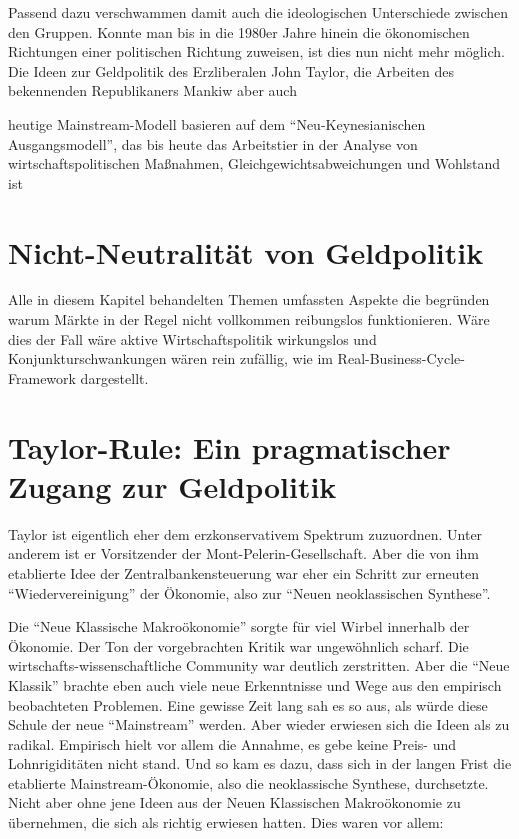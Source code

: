Passend dazu verschwammen damit auch die ideologischen Unterschiede zwischen den Gruppen. Konnte man bis in die 1980er Jahre hinein die ökonomischen Richtungen einer politischen Richtung zuweisen, ist dies nun nicht mehr möglich.
Die Ideen zur Geldpolitik des Erzliberalen John Taylor, die Arbeiten des bekennenden Republikaners Mankiw aber auch 


heutige Mainstream-Modell basieren auf dem "`Neu-Keynesianischen Ausgangsmodell"', das bis heute das Arbeitstier in der Analyse von wirtschaftspolitischen Maßnahmen, Gleichgewichtsabweichungen und Wohlstand ist \parencite[S. 52]{Gali2015}



\section{Nicht-Neutralität von Geldpolitik}
Alle  in diesem Kapitel behandelten Themen umfassten Aspekte die begründen warum Märkte in der Regel nicht vollkommen reibungslos funktionieren. Wäre dies der Fall wäre aktive Wirtschaftspolitik wirkungslos und Konjunkturschwankungen wären rein zufällig, wie im Real-Business-Cycle-Framework dargestellt.

\textcite[S. 823]{Akerlof1985}


\section{Taylor-Rule: Ein pragmatischer Zugang zur Geldpolitik}
Taylor ist eigentlich eher dem erzkonservativem Spektrum zuzuordnen. Unter anderem ist er Vorsitzender der Mont-Pelerin-Gesellschaft. Aber die von ihm etablierte Idee der Zentralbankensteuerung war eher ein Schritt zur erneuten "`Wiedervereinigung"' der Ökonomie, also zur "`Neuen neoklassischen Synthese"'.

Die "`Neue Klassische Makroökonomie"' sorgte für viel Wirbel innerhalb der Ökonomie. Der Ton der vorgebrachten Kritik war ungewöhnlich scharf. Die wirtschafts-wissenschaftliche Community war deutlich zerstritten. Aber die "`Neue Klassik"' brachte eben auch viele neue Erkenntnisse und Wege aus den empirisch beobachteten Problemen. Eine gewisse Zeit lang sah es so aus, als würde diese Schule der neue "`Mainstream"' werden. Aber wieder erwiesen sich die Ideen als zu radikal. Empirisch hielt vor allem die Annahme, es gebe keine Preis- und Lohnrigiditäten nicht stand.
Und so kam es dazu, dass sich in der langen Frist die etablierte Mainstream-Ökonomie, also die neoklassische Synthese, durchsetzte. Nicht aber ohne jene Ideen aus der Neuen Klassischen Makroökonomie zu übernehmen, die sich als richtig erwiesen hatten. Dies waren vor allem:

